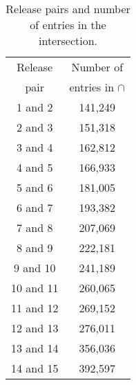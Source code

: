 \begin{table}[!h]
  \caption{Release pairs and number of entries in the intersection. }
  \label{tab_pairs}
  \scriptsize
  \begin{center}
    \begin{tabular}{cc}
	Release & Number of \\
	pair & entries in $\cap$\\
    \hline
	1 and 2 & 141,249 \\
	2 and 3 & 151,318 \\ 
	3 and 4 & 162,812 \\
	4 and 5 & 166,933 \\
	5 and 6 & 181,005 \\
	6 and 7 & 193,382 \\
	7 and 8 & 207,069 \\
	8 and 9 & 222,181 \\
	9 and 10 & 241,189 \\
	10 and 11 & 260,065 \\
	11 and 12 & 269,152 \\
	12 and 13 & 276,011 \\
	13 and 14 & 356,036 \\
	14 and 15 & 392,597 \\
    \end{tabular}
  \end{center}
\end{table}


